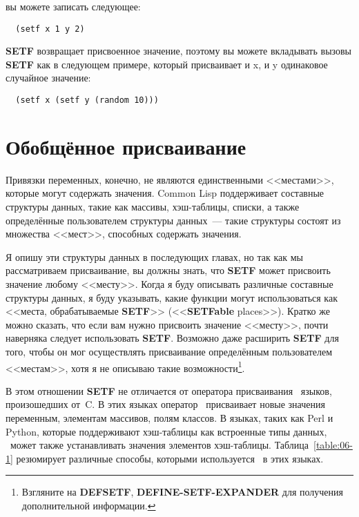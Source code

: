 вы можете записать следующее:

\begin{lstlisting}
  (setf x 1 y 2)
\end{lstlisting}

\textbf{SETF} возвращает присвоенное значение, поэтому вы можете вкладывать вызовы
\textbf{SETF} как в следующем примере, который присваивает и x, и y одинаковое случайное
значение:

\begin{lstlisting}
  (setf x (setf y (random 10)))
\end{lstlisting}

\section{Обобщённое присваивание}

Привязки переменных, конечно, не являются единственными <<местами>>, которые могут содержать
значения. Common Lisp поддерживает составные структуры данных, такие как массивы,
хэш-таблицы, списки, а также определённые пользователем структуры данных~--- такие
структуры состоят из множества <<мест>>, способных содержать значения.

Я опишу эти структуры данных в последующих главах, но так как мы рассматриваем
присваивание, вы должны знать, что \textbf{SETF} может присвоить значение любому
<<месту>>. Когда я буду описывать различные составные структуры данных, я буду указывать,
какие функции могут использоваться как <<места, обрабатываемые \textbf{SETF}>>
(<<\textbf{SETFable} places>>). Кратко же можно сказать, что если вам нужно присвоить
значение <<месту>>, почти наверняка следует использовать \textbf{SETF}. Возможно даже
расширить \textbf{SETF} для того, чтобы он мог осуществлять присваивание определённым
пользователем <<местам>>, хотя я не описываю такие возможности\footnote{Взгляните на
  \textbf{DEFSETF}, \textbf{DEFINE-SETF-EXPANDER} для получения дополнительной
  информации.}.

В этом отношении \textbf{SETF} не отличается от оператора присваивания~\code{=} языков,
произошедших от~C. В этих языках оператор~\code{=} присваивает новые значения переменным,
элементам массивов, полям классов. В языках, таких как Perl и Python, которые поддерживают
хэш-таблицы как встроенные типы данных, \code{=}~может также устанавливать значения
элементов хэш-таблицы. Таблица~\ref{table:06-1} резюмирует различные способы, которыми
используется~\code{=} в этих языках.

